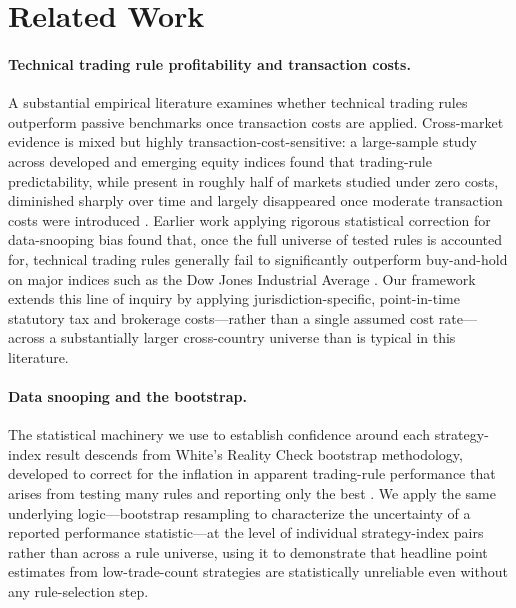 \documentclass[11pt]{article}
\begin{document}
\section{Related Work}

\paragraph{Technical trading rule profitability and transaction costs.} A substantial empirical literature examines whether technical trading rules outperform passive benchmarks once transaction costs are applied. Cross-market evidence is mixed but highly transaction-cost-sensitive: a large-sample study across developed and emerging equity indices found that trading-rule predictability, while present in roughly half of markets studied under zero costs, diminished sharply over time and largely disappeared once moderate transaction costs were introduced \citep{hanauer2023}. Earlier work applying rigorous statistical correction for data-snooping bias found that, once the full universe of tested rules is accounted for, technical trading rules generally fail to significantly outperform buy-and-hold on major indices such as the Dow Jones Industrial Average \citep{sullivan1999}. Our framework extends this line of inquiry by applying jurisdiction-specific, point-in-time statutory tax and brokerage costs---rather than a single assumed cost rate---across a substantially larger cross-country universe than is typical in this literature.

\paragraph{Data snooping and the bootstrap.} The statistical machinery we use to establish confidence around each strategy-index result descends from White's Reality Check bootstrap methodology, developed to correct for the inflation in apparent trading-rule performance that arises from testing many rules and reporting only the best \citep{white2000, sullivan1999}. We apply the same underlying logic---bootstrap resampling to characterize the uncertainty of a reported performance statistic---at the level of individual strategy-index pairs rather than across a rule universe, using it to demonstrate that headline point estimates from low-trade-count strategies are statistically unreliable even without any rule-selection step.
\end{document}
